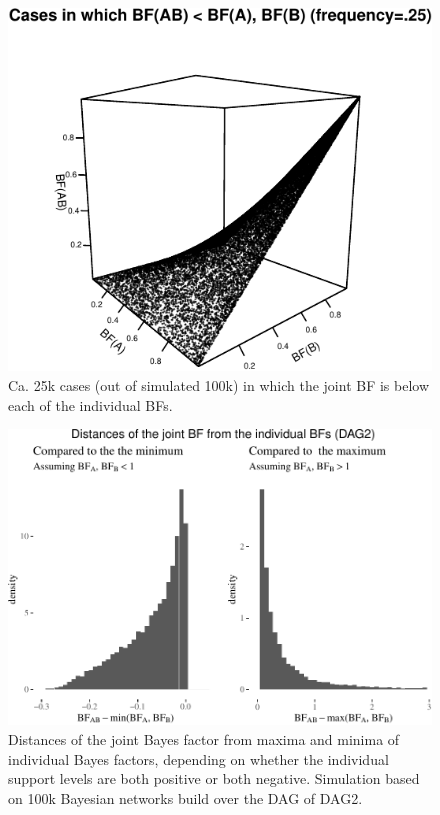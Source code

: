 \documentclass[
  10pt,
  dvipsnames,enabledeprecatedfontcommands]{scrartcl}
\begin{document}
\begin{figure}

\begin{center}\includegraphics[width=1\linewidth]{conjunction-appendix13_files/figure-latex/unnamed-chunk-14-1} \end{center}
\caption{Ca. 25k cases (out of simulated 100k) in which the joint BF is below each of the individual BFs.}
\label{fig:BFfails}
\end{figure}

\vspace{1mm}
\footnotesize

\normalsize

\begin{figure}

\begin{center}\includegraphics[width=1\linewidth]{conjunction-appendix13_files/figure-latex/BFind2-1} \end{center}

\caption{Distances of the joint Bayes factor from maxima and minima of individual Bayes factors, depending on whether the individual support levels are both positive or both negative. Simulation based on 100k Bayesian networks build over the DAG of \textsf{DAG2}.}
\label{fig:BFind2}
\end{figure}
\end{document}
